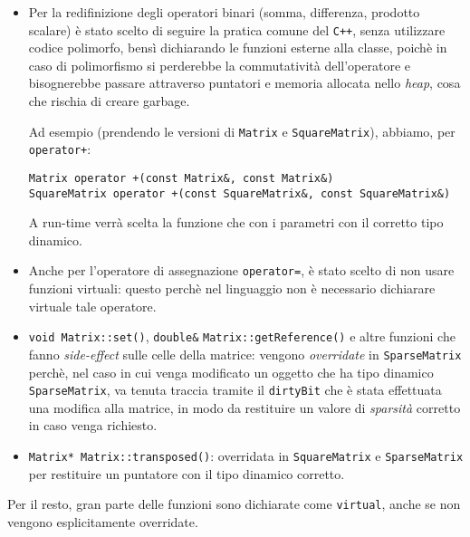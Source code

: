 \begin{itemize}
    \item Per la redifinizione degli operatori binari (somma, differenza, prodotto scalare) è stato scelto di seguire la 
    pratica comune del \texttt{C++}, senza utilizzare codice polimorfo, bensì dichiarando le funzioni esterne alla 
    classe, poichè in caso di polimorfismo si perderebbe la commutatività dell'operatore e bisognerebbe passare 
    attraverso puntatori e memoria allocata nello \emph{heap}, cosa che rischia di creare garbage.\par 
    Ad esempio (prendendo le versioni di \texttt{Matrix} e \texttt{SquareMatrix}), abbiamo, per \texttt{operator+}:
    \begin{center}
        \texttt{Matrix operator +(const Matrix}\verb|&|\texttt{, const Matrix}\verb|&|\texttt{)} \\
        \texttt{SquareMatrix operator +(const SquareMatrix}\verb|&|\texttt{, const SquareMatrix}\verb|&|\texttt{)}
    \end{center}
    A run-time verrà scelta la funzione che con i parametri con il corretto tipo dinamico.
    
    \item Anche per l'operatore di assegnazione \texttt{operator=}, è stato scelto di non usare funzioni virtuali:
    questo perchè nel linguaggio non è necessario dichiarare virtuale tale operatore.

    \item \texttt{void Matrix::set()}, \texttt{double}\verb|&| \texttt{Matrix::getReference()} e altre funzioni che fanno \emph{side-effect}
    sulle celle della matrice: vengono \emph{overridate} in \texttt{SparseMatrix} perchè, nel caso in cui 
    venga modificato un oggetto che ha tipo dinamico \texttt{SparseMatrix},
    va tenuta traccia tramite il \texttt{dirtyBit} che è stata effettuata una modifica alla matrice, in modo
    da restituire un valore di \emph{sparsità} corretto in caso venga richiesto.

    \item \texttt{Matrix* Matrix::transposed()}: overridata in \texttt{SquareMatrix} e \texttt{SparseMatrix} 
    per restituire un puntatore con il tipo dinamico corretto. 
\end{itemize}
Per il resto, gran parte delle funzioni sono dichiarate come \texttt{virtual}, anche se non vengono esplicitamente overridate.

